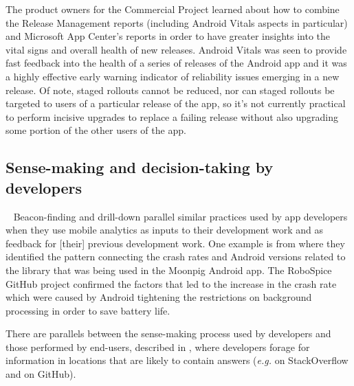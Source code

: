 The product owners for the Commercial Project learned about how to combine the Release Management reports (including Android Vitals aspects in particular) and Microsoft App Center's reports in order to have greater insights into the vital signs and overall health of new releases. Android Vitals was seen to provide fast feedback into the health of a series of releases of the Android app and it was a highly effective early warning indicator of reliability issues emerging in a new release. Of note, staged rollouts cannot be reduced, nor can staged rollouts be targeted to users of a particular release of the app, so it's not currently practical to perform incisive upgrades to replace a failing release without also upgrading some portion of the other users of the app.

\subsection{Sense-making and decision-taking by developers}~\label{aiu-sensemaking-and-decision-taking-by-developers-section}
Beacon-finding and drill-down parallel similar practices used by app developers when they use mobile analytics as inputs to their development work and as feedback for [their] previous development work. One example is from  where they identified the pattern connecting the crash rates and Android versions related to the  library that was being used in the Moonpig Android app. The RoboSpice GitHub project confirmed the factors that led to the increase in the crash rate which were caused by Android tightening the restrictions on background processing in order to save battery life. 

There are parallels between the sense-making process used by developers and those performed by end-users, described in , where developers forage for information in locations that are likely to contain answers (\emph{e.g.} on StackOverflow and on GitHub).

